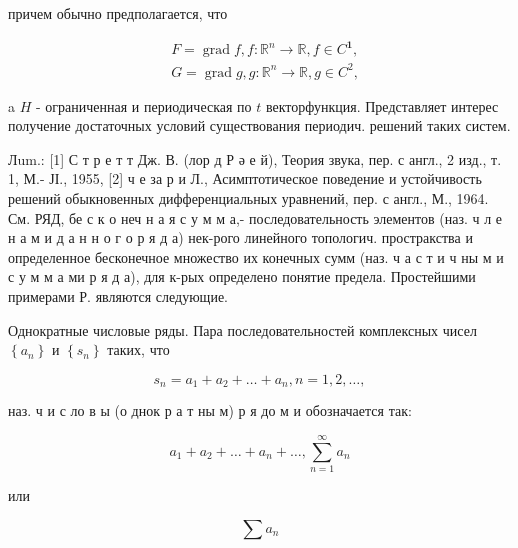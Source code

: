 \documentclass[10pt]{article}
\begin{document}
причем обычно предполагается, что



\[

\begin{aligned}

& F=\operatorname{grad} f, f: \mathbb{R}^{n} \longrightarrow \mathbb{R}, f \in C^{\mathbf{1}}, \\

& G=\operatorname{grad} g, g: \mathbb{R}^{n} \longrightarrow \mathbb{R}, g \in C^{2},

\end{aligned}

\]



a $H$ - ограниченная и периодическая по $t$ векторфункция. Представляет интерес получение достаточных условий существования периодич. решений таких систем.



Лum.: [1] С т р е т т Дж. В. (лор д Р ә е й), Теория звука, пер. с англ., 2 изд., т. 1, М.- ЈІ., 1955, [2] ч е за р и Л., Асимптотическое поведение и устойчивость решений обыкновенных дифференциальных уравнений, пер. с англ., М., 1964. См. РЯД, бе с к о неч н а я с у м м а,- последовательность элементов (наз. ч л е н а м и д а н н о г о р я д а) нек-рого линейного топологич. простракства и определенное бесконечное множество их конечных сумм (наз. ч а с т и ч ны м и с у м м а ми р я д а), для к-рых определено понятие предела. Простейшими примерами Р. являются следующие.



Однократные числовые ряды. Пара последовательностей комплексных чисел $\left\{a_{n}\right\}$ и $\left\{s_{n}\right\}$ таких, что



\[

s_{n}=a_{1}+a_{2}+\ldots+a_{n}, n=1,2, \ldots,

\]



наз. ч и с ло в ы (о днок р а т ны м) р я до м и обозначается так:



\[

a_{1}+a_{2}+\ldots+a_{n}+\ldots, \sum_{n=1}^{\infty} a_{n}

\]



или



\[

\sum a_{n}

\]
\end{document}
